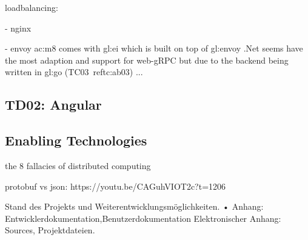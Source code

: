 loadbalancing:

- nginx

- envoy
\gls{ac:m8} comes with \gls{gl:ei} which is built on top of \gls{gl:envoy}
.Net seems have the most adaption and support for web-gRPC but due to the backend being written in \gls{gl:go} (TC03~ref{tc:ab03}) ...

\subsection{TD02: Angular}

\subsection{Enabling Technologies}

the 8 fallacies of distributed computing

protobuf vs json: https://youtu.be/CAGuhVIOT2c?t=1206

Stand des Projekts und Weiterentwicklungsmöglichkeiten.
• Anhang: Entwicklerdokumentation,Benutzerdokumentation
Elektronischer Anhang: Sources, Projektdateien.